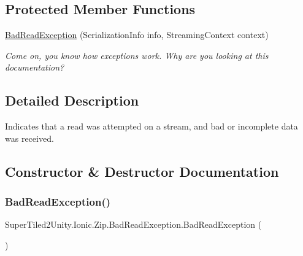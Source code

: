 \subsection*{Protected Member Functions}
\begin{DoxyCompactItemize}
\item 
\mbox{\hyperlink{class_super_tiled2_unity_1_1_ionic_1_1_zip_1_1_bad_read_exception_af4a1bba107069a8a3b3ca2434a8645d3}{Bad\+Read\+Exception}} (Serialization\+Info info, Streaming\+Context context)
\begin{DoxyCompactList}\small\item\em Come on, you know how exceptions work. Why are you looking at this documentation? \end{DoxyCompactList}\end{DoxyCompactItemize}


\subsection{Detailed Description}
Indicates that a read was attempted on a stream, and bad or incomplete data was received. 



\subsection{Constructor \& Destructor Documentation}
\mbox{\label{class_super_tiled2_unity_1_1_ionic_1_1_zip_1_1_bad_read_exception_aba59d0343716cfacfe3163ae09738e1b}} 
\subsubsection{\texorpdfstring{Bad\+Read\+Exception()}{BadReadException()}\hspace{0.1cm}{\footnotesize\ttfamily [1/4]}}
{\footnotesize\ttfamily Super\+Tiled2\+Unity.\+Ionic.\+Zip.\+Bad\+Read\+Exception.\+Bad\+Read\+Exception (\begin{DoxyParamCaption}{ }\end{DoxyParamCaption})}



